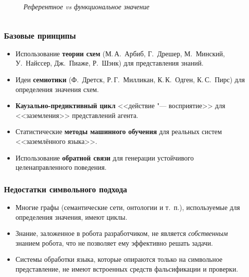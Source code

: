 \documentclass[default]{beamer}
\begin{document}
\begin{frame}
\begin{columns}
\begin{column}{0.3\textwidth}
\begin{figure}
					{
							\scriptsize
							\textit{Референтное vs функциональное значение}
					}
				\end{figure}
			\end{column}
		\end{columns}
		
	\end{frame}	

	\begin{frame}
		\frametitle{Базовые принципы}
		
		\begin{itemize}
			\item Использование \textbf{теории схем} (М.\,А.~Арбиб, Г.~Дрешер, М.~Минский, У.~Найссер, Дж.~Пиаже, Р.~Шэнк) для представления знаний.
			\item Идеи \textbf{семиотики} (Ф.~Дретск, Р.\,Г.~Милликан, К.\,К.~Одген, К.\,С.~Пирс) для определения значения схем.
			\item \textbf{Каузально-предиктивный цикл} <<действие "--- восприятие>> для <<заземления>> представлений агента.
			\item Статистические \textbf{методы машинного обучения} для реальных систем <<заземлённого языка>>.
			\item Использование \textbf{обратной связи} для генерации устойчивого целенаправленного поведения.
		\end{itemize}
	\end{frame}

	\begin{frame}
		\frametitle{Недостатки символьного подхода}
		
		\nocite{*}
		\printbibliography[keyword={symbol}]
					
		\par\bigskip
		\begin{itemize}
			\item Многие графы (семантические сети, онтологии и т.~п.), используемые для определения значения, имеют циклы.
			\item Знание, заложенное в робота разработчиком, не является \textit{собственным} знанием робота, что не позволяет ему эффективно решать задачи.
			\item Системы обработки языка, которые опираются только на символьное представление, не имеют встроенных средств фальсификации и проверки.
		\end{itemize}
	\end{frame}
\end{document}
